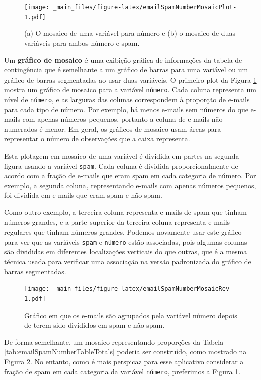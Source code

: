 \documentclass[
]{book}
\theoremstyle{definition}
\theoremstyle{definition}
\theoremstyle{definition}
\theoremstyle{definition}
\theoremstyle{remark}
\begin{document}
\begin{figure}
\centering
\texttt{[image: \_main\_files/figure-latex/emailSpamNumberMosaicPlot-1.pdf]}
\caption{\label{fig:emailSpamNumberMosaicPlot}(a) O mosaico de uma variável para número e (b) o mosaico de duas variáveis para ambos número e spam.}
\end{figure}

Um \textbf{gráfico de mosaico} é uma exibição gráfica de informações da tabela de contingência que é semelhante a um gráfico de barras para uma variável ou um gráfico de barras segmentadas ao usar duas variáveis. O primeiro plot da Figura \ref{fig:emailSpamNumberMosaicPlot} mostra um gráfico de mosaico para a variável \texttt{número}. Cada coluna representa um nível de \texttt{número}, e as larguras das colunas correspondem à proporção de e-mails para cada tipo de número. Por exemplo, há menos e-mails sem números do que e-mails com apenas números pequenos, portanto a coluna de e-mails não numerados é menor. Em geral, os gráficos de mosaico usam áreas para representar o número de observações que a caixa representa.

Esta plotagem em mosaico de uma variável é dividida em partes na segunda figura usando a variável \texttt{spam}. Cada coluna é dividida proporcionalmente de acordo com a fração de e-mails que eram spam em cada categoria de número. Por exemplo, a segunda coluna, representando e-mails com apenas números pequenos, foi dividida em e-mails que eram spam e não spam.

Como outro exemplo, a terceira coluna representa e-mails de spam que tinham números grandes, e a parte superior da terceira coluna representa e-mails regulares que tinham números grandes. Podemos novamente usar este gráfico para ver que as variáveis \texttt{spam} e \texttt{número} estão associadas, pois algumas colunas são divididas em diferentes localizações verticais do que outras, que é a mesma técnica usada para verificar uma associação na versão padronizada do gráfico de barras segmentadas.

\begin{figure}
\centering
\texttt{[image: \_main\_files/figure-latex/emailSpamNumberMosaicRev-1.pdf]}
\caption{\label{fig:emailSpamNumberMosaicRev}Gráfico em que os e-mails são agrupados pela variável número depois de terem sido divididos em spam e não spam.}
\end{figure}

De forma semelhante, um mosaico representando proporções da Tabela \ref{tab:emailSpamNumberTableTotals} poderia ser construído, como mostrado na Figura \ref{fig:emailSpamNumberMosaicRev}. No entanto, como é mais perspicaz para esse aplicativo considerar a fração de spam em cada categoria da variável \texttt{número}, preferimos a Figura \ref{fig:emailSpamNumberMosaicPlot}.
\end{document}
